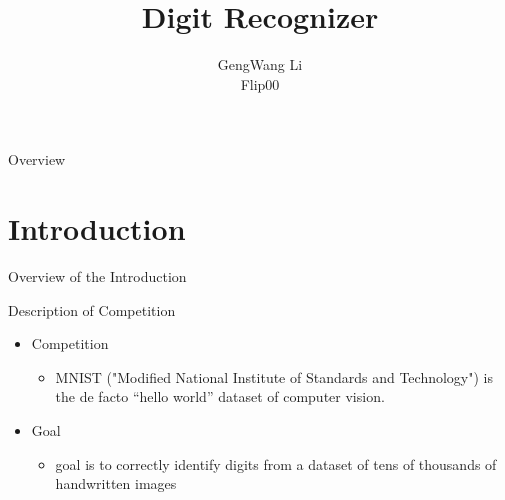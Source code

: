 \documentclass[
 size=12pt,
 paper=smartboard, %
 mode=present, %
 display=slides, %
style=tuliplab,
pauseslide,
fleqn,leqno]{powerdot}
\title{Digit Recognizer}
\author{
GengWang Li
\\
Flip00 
}
\date{\gitCommitterDate}
\begin{document}
\maketitle 

\begin{slide}[toc=,bm=]{Overview}
\tableofcontents[content=sections]
\end{slide}


\section{Introduction}

\begin{slide}[toc=,bm=]{Overview of the Introduction}
\tableofcontents[content=currentsection,type=1]
\end{slide}

\begin{slide}{Description of Competition}
  \begin{itemize}
    \item Competition \pause
    \begin{itemize}
      \item MNIST ("Modified National Institute of Standards and Technology") is the 
      de facto “hello world” dataset of computer vision.
    \end{itemize}
    \item Goal \pause
    \begin{itemize}
      \item goal is to correctly identify digits from a dataset of tens of thousands of handwritten images  
    \end{itemize}    
  \end{itemize}
\end{slide}
\end{document}
